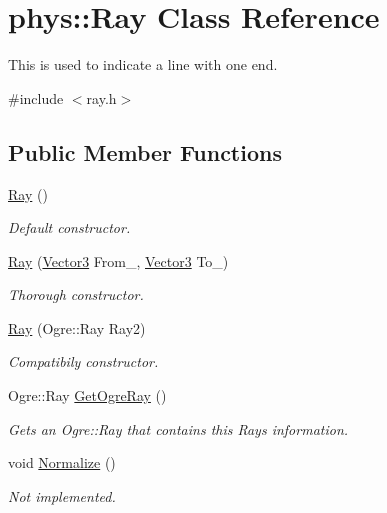 \hypertarget{classphys_1_1Ray}{
\section{phys::Ray Class Reference}
\label{df/d57/classphys_1_1Ray}
}


This is used to indicate a line with one end.  




{\ttfamily \#include $<$ray.h$>$}

\subsection*{Public Member Functions}
\begin{DoxyCompactItemize}
\item 
\hyperlink{classphys_1_1Ray_a35f4f5eec653ea561353163eaad672d3}{Ray} ()
\begin{DoxyCompactList}\small\item\em Default constructor. \item\end{DoxyCompactList}\item 
\hyperlink{classphys_1_1Ray_aa6123ef37a2351e6cca3954c23212379}{Ray} (\hyperlink{classphys_1_1Vector3}{Vector3} From\_\-, \hyperlink{classphys_1_1Vector3}{Vector3} To\_\-)
\begin{DoxyCompactList}\small\item\em Thorough constructor. \item\end{DoxyCompactList}\item 
\hyperlink{classphys_1_1Ray_a395485ffe19e6a53966730c01a2781c1}{Ray} (Ogre::Ray Ray2)
\begin{DoxyCompactList}\small\item\em Compatibily constructor. \item\end{DoxyCompactList}\item 
Ogre::Ray \hyperlink{classphys_1_1Ray_a21fbd19de94f238998930213ab72622a}{GetOgreRay} ()
\begin{DoxyCompactList}\small\item\em Gets an Ogre::Ray that contains this Rays information. \item\end{DoxyCompactList}\item 
void \hyperlink{classphys_1_1Ray_a2acbaef60718001a048db26ccaaef787}{Normalize} ()
\begin{DoxyCompactList}\small\item\em Not implemented. \item\end{DoxyCompactList}\item 

\end{DoxyCompactItemize}

